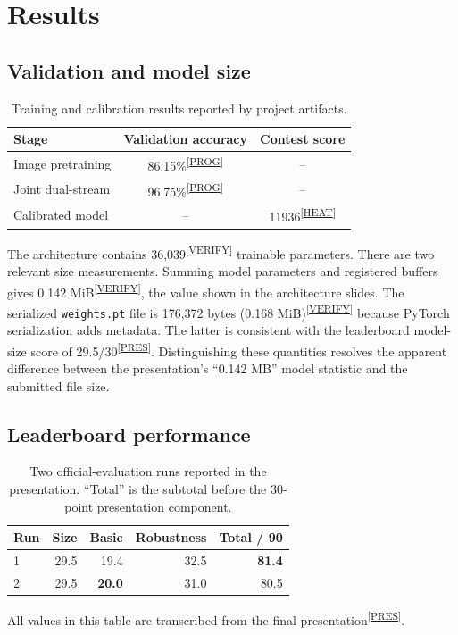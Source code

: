 \documentclass[10pt,twocolumn,a4paper]{article}
\newcommand{\evidence}[1]{\textsuperscript{\scriptsize[\hyperref[ev:#1]{#1}]}}
\newcommand{\result}[2]{#1\evidence{#2}}
\begin{document}
\section{Results}
\label{sec:results}

\subsection{Validation and model size}

\begin{table}[t]
  \centering
  \caption{Training and calibration results reported by project artifacts.}
  \label{tab:training-results}
  \small
  \begin{tabular}{lcc}
    \toprule
    Stage & Validation accuracy & Contest score \\
    \midrule
    Image pretraining & 86.15\%\evidence{PROG} & -- \\
    Joint dual-stream & 96.75\%\evidence{PROG} & -- \\
    Calibrated model & -- & 11936\evidence{HEAT} \\
    \bottomrule
  \end{tabular}
\end{table}

The architecture contains \result{36,039}{VERIFY} trainable parameters. There
are two relevant size measurements. Summing model parameters and registered
buffers gives \result{0.142 MiB}{VERIFY}, the value shown in the architecture
slides. The serialized \texttt{weights.pt} file is
\result{176,372 bytes (0.168 MiB)}{VERIFY} because PyTorch serialization adds
metadata. The latter is consistent with the leaderboard model-size score of
\result{29.5/30}{PRES}. Distinguishing these quantities resolves the apparent
difference between the presentation's ``0.142 MB'' model statistic and the
submitted file size.

\subsection{Leaderboard performance}

\begin{table}[t]
  \centering
  \caption{Two official-evaluation runs reported in the presentation.
  ``Total'' is the subtotal before the 30-point presentation component.}
  \label{tab:leaderboard}
  \small
  \setlength{\tabcolsep}{4pt}
  \begin{tabular}{lrrrr}
    \toprule
    Run & Size & Basic & Robustness & Total / 90 \\
    \midrule
    1 & 29.5 & 19.4 & 32.5 & \textbf{81.4} \\
    2 & 29.5 & \textbf{20.0} & 31.0 & 80.5 \\
    \bottomrule
  \end{tabular}
  \vspace{2pt}

  \raggedright\scriptsize All values in this table are transcribed from the
  final presentation\evidence{PRES}.
\end{table}
\end{document}
